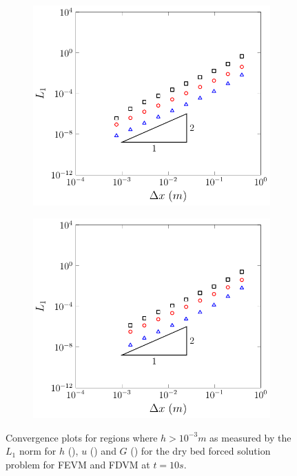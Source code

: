 \begin{figure}
	\centering
	\begin{subfigure}{0.5\textwidth}
		\includegraphics[width=\textwidth]{./chp5/figures/Forced/Dry/FEVML1red.pdf}
		\vspace{0.5cm}
	\end{subfigure}%
	\begin{subfigure}{0.5\textwidth}
		\includegraphics[width=\textwidth]{./chp5/figures/Forced/Dry/FDVML1red.pdf}
		\vspace{0.5cm}
	\end{subfigure}
	\caption{Convergence plots for regions where $h > 10^{-3}m$ as measured by the $L_1$ norm for $h$ (), $u$ () and $G$ () for the dry bed forced solution problem for FEVM and FDVM at $t=10s$.}
	\label{fig:ForcedSolDryL1restrict}
\end{figure}
